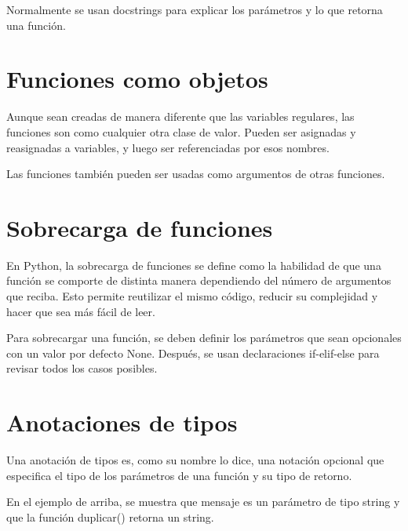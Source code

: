 \documentclass{report}
\begin{document}
{Normalmente se usan docstrings para explicar los parámetros y lo que retorna una función.


\section{Funciones como objetos}

Aunque sean creadas de manera diferente que las variables regulares, las funciones son como cualquier otra clase de valor. Pueden ser asignadas y reasignadas a variables, y luego ser referenciadas por esos nombres.


Las funciones también pueden ser usadas como argumentos de otras funciones.


\section{Sobrecarga de funciones}

En Python, la sobrecarga de funciones se define como la habilidad de que una función se comporte de distinta manera dependiendo del número de argumentos que reciba. Esto permite reutilizar el mismo código, reducir su complejidad y hacer que sea más fácil de leer.

Para sobrecargar una función, se deben definir los parámetros que sean opcionales con un valor por defecto None. Después, se usan declaraciones if-elif-else para revisar todos los casos posibles.



\section{Anotaciones de tipos}

Una anotación de tipos es, como su nombre lo dice, una notación opcional que especifica el tipo de los parámetros de una función y su tipo de retorno.


En el ejemplo de arriba, se muestra que mensaje es un parámetro de tipo string y que la función duplicar() retorna un string.

}
\end{document}
